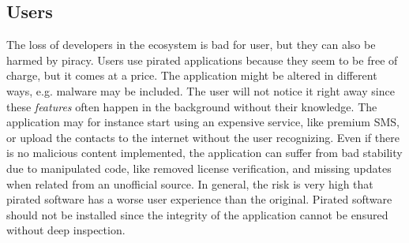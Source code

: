 \subsection{Users} \label{subsection:foundation-piracy-users}
The loss of developers in the ecosystem is bad for user, but they can also be harmed by piracy.
Users use pirated applications because they seem to be free of charge, but it comes at a price.
The application might be altered in different ways, e.g. malware may be included.
The user will not notice it right away since these \textit{features} often happen in the background without their knowledge.
The application may for instance start using an expensive service, like premium SMS, or upload the contacts to the internet without the user recognizing.
Even if there is no malicious content implemented, the application can suffer from bad stability due to manipulated code, like removed license verification, and missing updates when related from an unofficial source.
In general, the risk is very high that pirated software has a worse user experience than the original. \cite{bitdefenderPlagiarism} \cite{lierschDeveloperThreats}
\newline
Pirated software should not be installed since the integrity of the application cannot be ensured without deep inspection.
